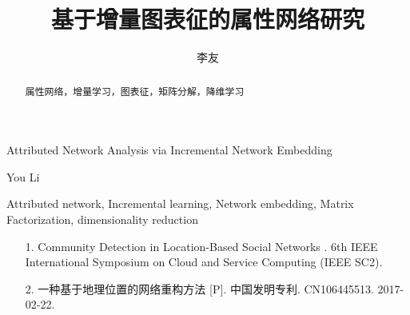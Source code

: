 \documentclass{sysuthesis} %
\numberwithin{algorithm}{chapter}
\theoremstyle{plain}
\theoremstyle{definition}
\theoremstyle{definition}
\begin{document}
\title{基于增量图表征的属性网络研究}{}{Attributed Network Analysis via Incremental Network Embedding}{}

\author{李友}{You Li}




\maketitle

\begin{abstract}{属性网络，增量学习，图表征，矩阵分解，降维学习}
  
\end{abstract}

\begin{englishabstract}{Attributed network, Incremental learning, Network embedding, Matrix Factorization, dimensionality reduction}
  
\end{englishabstract}

\tableofcontents


\begin{Main} %










%

%

\end{Main} %






\newpage
\printindex %

\begin{Resume}
\begin{itemize}
\item [1.] Community Detection in Location-Based Social Networks . 6th IEEE International Symposium on Cloud and Service Computing (IEEE SC2). 
\item [2.]  一种基于地理位置的网络重构方法 [P]. 中国发明专利. CN106445513. 2017-02-22.
\end{itemize}
\end{Resume}





\begin{Acknowledgement}


\vspace{6pt}


\end{Acknowledgement}
\end{document}
